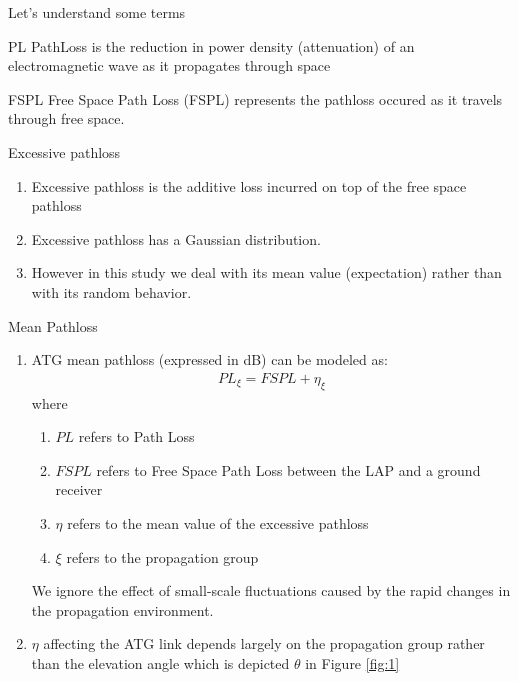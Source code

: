 \documentclass{beamer}
\begin{document}
\begin{frame}{Let's understand some terms}
    \begin{block}{PL}
    PathLoss is the reduction in power density (attenuation) of an electromagnetic wave as it propagates through space
    \end{block}
    
     \begin{block}{FSPL}
   Free Space Path Loss (FSPL) represents the  pathloss occured as it travels through free space.
    \end{block}
    
    \begin{block}{Excessive pathloss}
    \begin{enumerate}
        \item Excessive pathloss is the additive loss incurred on top of
the free space pathloss
\item Excessive pathloss has a Gaussian distribution.
\item However in this study we deal with its mean value (expectation) rather than with its random behavior.
    \end{enumerate}
   \end{block}
   
\end{frame}

\begin{frame}{Mean Pathloss}
   \begin{enumerate}
       \item ATG mean pathloss (expressed in dB) can be modeled as:
       \begin{align}
           PL_\xi = FSPL + \eta_{\xi}
           \label{eqn:1}
       \end{align}
       where
       \begin{enumerate}
           \item $PL$ refers to Path Loss
           \item $FSPL$ refers to Free Space Path Loss between the
LAP and a ground receiver
           \item $\eta$ refers to the mean value of the excessive pathloss
\item $\xi$ refers to the propagation group
       \end{enumerate}
       We ignore the effect of small-scale fluctuations caused by the rapid changes in the propagation environment.
       \item $\eta$ affecting the ATG link depends largely on the propagation group rather than the elevation angle which is depicted $\theta$ in Figure \ref{fig:1}
   \end{enumerate}
\end{frame}
\end{document}

